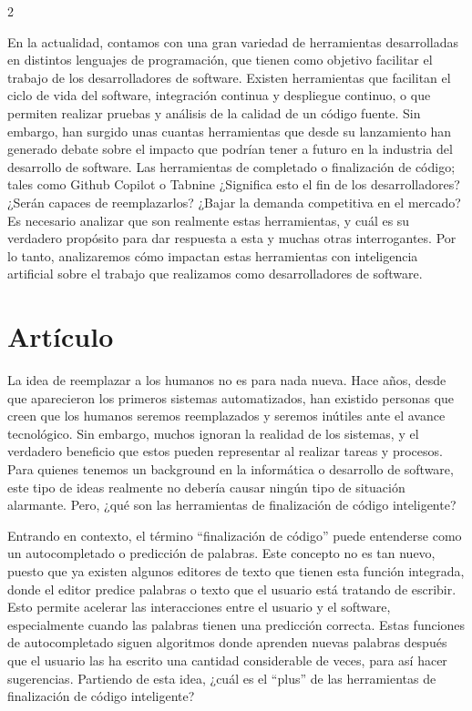 \documentclass[12pt,spanish,Letterpaper,openany]{book}
\begin{document}
\begin {multicols}{2}

En la actualidad, contamos con una gran variedad de herramientas desarrolladas en distintos lenguajes de programación, que tienen como objetivo facilitar el trabajo de los desarrolladores de software. Existen herramientas que facilitan el ciclo de vida del software, integración continua y despliegue continuo, o que permiten realizar pruebas y análisis de la calidad de un código fuente. Sin embargo, han surgido unas cuantas herramientas que desde su lanzamiento han generado debate sobre el impacto que podrían tener a futuro en la industria del desarrollo de software. Las herramientas de completado o finalización de código; tales como Github Copilot o Tabnine ¿Significa esto el fin de los desarrolladores? ¿Serán capaces de reemplazarlos? ¿Bajar la demanda competitiva en el mercado? Es necesario analizar que son realmente estas herramientas, y cuál es su verdadero propósito para dar respuesta a esta y muchas otras interrogantes. Por lo tanto, analizaremos cómo impactan estas herramientas con inteligencia artificial sobre el trabajo que realizamos como desarrolladores de software.

\hypertarget{artuxedculo}{%
\section{Artículo}\label{artuxedculo}}

La idea de reemplazar a los humanos no es para nada nueva. Hace años, desde que aparecieron los primeros sistemas automatizados, han existido personas que creen que los humanos seremos reemplazados y seremos inútiles ante el avance tecnológico. Sin embargo, muchos ignoran la realidad de los sistemas, y el verdadero beneficio que estos pueden representar al realizar tareas y procesos. Para quienes tenemos un background en la informática o desarrollo de software, este tipo de ideas realmente no debería causar ningún tipo de situación alarmante. Pero, ¿qué son las herramientas de finalización de código inteligente?

Entrando en contexto, el término ``finalización de código'' puede entenderse como un autocompletado o predicción de palabras. Este concepto no es tan nuevo, puesto que ya existen algunos editores de texto que tienen esta función integrada, donde el editor predice palabras o texto que el usuario está tratando de escribir. Esto permite acelerar las interacciones entre el usuario y el software, especialmente cuando las palabras tienen una predicción correcta. Estas funciones de autocompletado siguen algoritmos donde aprenden nuevas palabras después que el usuario las ha escrito una cantidad considerable de veces, para así hacer sugerencias. Partiendo de esta idea, ¿cuál es el ``plus'' de las herramientas de finalización de código inteligente?


\end{multicols}
\end{document}
